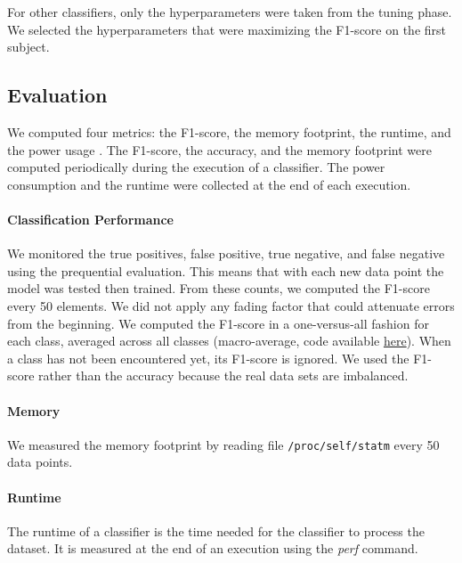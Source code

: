 For other classifiers, only the 
hyperparameters were taken from the tuning phase.
We selected the hyperparameters that were
maximizing the F1-score on the first subject.


\subsection{Evaluation}
We computed four metrics: the F1-score, the memory
footprint, the runtime, and the power usage .
The F1-score, the accuracy, and the memory
footprint were computed periodically during the
execution of a classifier. The
power consumption and the runtime were collected
at the end of each execution.

\paragraph{Classification Performance}
We monitored the true positives, false positive,
true negative, and false negative using the
prequential evaluation. This means that with each
new data point the model was tested then trained.
From these counts, we computed the F1-score every
50 elements. We did not apply any fading factor
that could attenuate errors from the beginning.
We computed the F1-score in a one-versus-all
fashion for each class, averaged across all
classes
(macro-average, code available \href{https://github.com/azazel7/paper-benchmark/blob/9adb1039c5a65a00a66d554f0e870d14d3fff7cb/main.cpp\#L82}{here}).  When a class has not been encountered yet, its F1-score is ignored.
We used the F1-score rather than the accuracy
because the real data sets are imbalanced.

\paragraph{Memory}
We measured the memory footprint by reading file
\texttt{/proc/self/statm} every 50 data points.

\paragraph{Runtime}
The runtime of a classifier is the time needed for
the classifier to process the dataset. It is
measured at the end of an execution using the
\textit{perf}
command.


